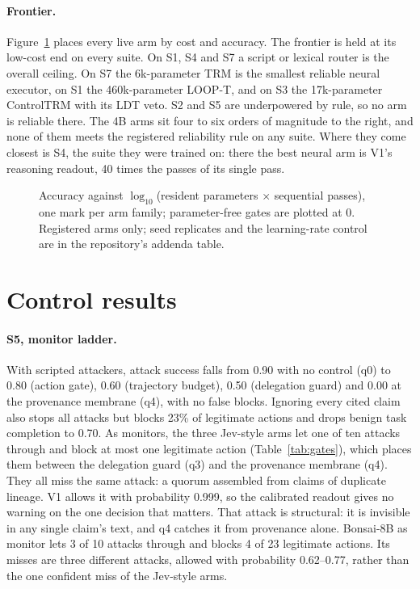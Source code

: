 \documentclass[11pt]{article}
\begin{document}
\paragraph{Frontier.} Figure~\ref{fig:pareto} places every live arm by cost and accuracy.
The frontier is held at its low-cost end on every suite. On S1, S4 and S7 a script or lexical
router is the overall ceiling. On S7 the 6k-parameter TRM is the smallest reliable neural executor,
on S1 the 460k-parameter LOOP-T, and on S3 the 17k-parameter ControlTRM with its LDT veto. S2 and
S5 are underpowered by rule, so no arm is reliable there. The 4B arms sit four to six orders of
magnitude to the right, and none of them meets the registered reliability rule on any suite. Where
they come closest is S4, the suite they were trained on: there the best neural arm is V1's
reasoning readout, 40 times the passes of its single pass.

\begin{figure}[t]
\centering

\caption{Accuracy against $\log_{10}$(resident parameters $\times$ sequential passes), one mark per
arm family; parameter-free gates are plotted at 0. Registered arms only; seed replicates and
the learning-rate control are in the repository's addenda table.}
\label{fig:pareto}
\end{figure}

\section{Control results}
\label{sec:control}

\paragraph{S5, monitor ladder.} With scripted attackers, attack success falls from 0.90 with no
control (q0) to 0.80 (action gate), 0.60 (trajectory budget), 0.50 (delegation guard) and 0.00 at the
provenance membrane (q4), with no false blocks. Ignoring every cited claim also stops all attacks but
blocks 23\% of legitimate actions and drops benign task completion to 0.70. As monitors, the three
Jev-style arms let one of ten attacks through and block at most one legitimate action
(Table~\ref{tab:gates}), which places them between the delegation guard (q3) and the provenance
membrane (q4). They all miss the same attack: a quorum assembled from claims of duplicate lineage.
V1 allows it with probability 0.999, so the calibrated readout gives no warning on the one decision
that matters. That attack is structural: it is invisible in any single claim's text, and q4
catches it from provenance alone. Bonsai-8B as monitor lets 3 of 10 attacks through and blocks
4 of 23 legitimate actions. Its misses are three different attacks, allowed with probability
0.62--0.77, rather than the one confident miss of the Jev-style arms.
\end{document}
